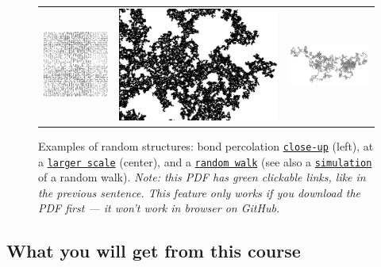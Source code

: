 \documentclass[oneside,11pt]{amsart}
\begin{document}
\begin{figure}[h]
	\begin{tabular}{ccc}
		\includegraphics[height=.32\textwidth]{img/Bond_percolation_p_51.png}
		&\hspace{10pt}\includegraphics[height=.32\textwidth]{img/Amas_de_percolation_gray.png}
		&\includegraphics[angle=90,height=.32\textwidth]{img/RW1.png}
	\end{tabular}
	\def\figurename{}
	\caption{Examples of random structures: bond percolation
	\href{https://en.wikipedia.org/wiki/Percolation_theory}{\texttt{close-up}}
	(left),
	at a \href{https://commons.wikimedia.org/wiki/File:Amas_de_percolation.png}{\texttt{larger scale}} (center),
	and
	a 
	\href{https://en.wikipedia.org/wiki/Random_walk\#Lattice_random_walk}{\texttt{random walk}}
	(see also a
	\href{https://upload.wikimedia.org/wikipedia/commons/f/f3/Random_walk_2500_animated.svg}{\texttt{simulation}} 
	of a random walk).
	\emph{Note:
	this PDF has green clickable links, like in the previous sentence.
	This feature only works if you download the PDF first --- it won't work in browser on GitHub.}
	}
\end{figure}

\subsection*{What you will get from this course}
\end{document}
